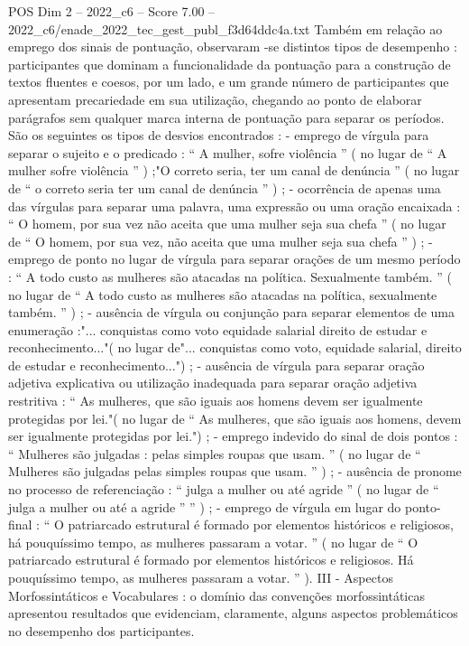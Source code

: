 \begin{textsample}{POS Dim 2 – 2022\_c6 – Score 7.00 – 2022\_c6/enade\_2022\_tec\_gest\_publ\_f3d64ddc4a.txt}
Também em relação ao emprego dos sinais de pontuação, observaram -se distintos tipos de desempenho : participantes que dominam a funcionalidade da pontuação para a construção de textos fluentes e coesos, por um lado, e um grande número de participantes que apresentam precariedade em sua utilização, chegando ao ponto de elaborar parágrafos sem qualquer marca interna de pontuação para separar os períodos.
São os seguintes os tipos de desvios encontrados : - emprego de vírgula para separar o sujeito e o predicado : “ A mulher, sofre violência ” ( no lugar de “ A mulher sofre violência ” ) ;"O correto seria, ter um canal de denúncia ” ( no lugar de “ o correto seria ter um canal de denúncia ” ) ; - ocorrência de apenas uma das vírgulas para separar uma palavra, uma expressão ou uma oração encaixada : “ O homem, por sua vez não aceita que uma mulher seja sua chefa ” ( no lugar de “ O homem, por sua vez, não aceita que uma mulher seja sua chefa ” ) ; - emprego de ponto no lugar de vírgula para separar orações de um mesmo período : “ A todo custo as mulheres são atacadas na política.
Sexualmente também. ” ( no lugar de “ A todo custo as mulheres são atacadas na política, sexualmente também. ” ) ; - ausência de vírgula ou conjunção para separar elementos de uma enumeração :"... conquistas como voto equidade salarial direito de estudar e reconhecimento..."( no lugar de"... conquistas como voto, equidade salarial, direito de estudar e reconhecimento...") ; - ausência de vírgula para separar oração adjetiva explicativa ou utilização inadequada para separar oração adjetiva restritiva : “ As mulheres, que são iguais aos homens devem ser igualmente protegidas por lei."( no lugar de “ As mulheres, que são iguais aos homens, devem ser igualmente protegidas por lei.") ; - emprego indevido do sinal de dois pontos : “ Mulheres são julgadas : pelas simples roupas que usam. ” ( no lugar de “ Mulheres são julgadas pelas simples roupas que usam. ” ) ; - ausência de pronome no processo de referenciação : “ julga a mulher ou até agride ” ( no lugar de “ julga a mulher ou até a agride ” ” ) ; - emprego de vírgula em lugar do ponto-final : “ O patriarcado estrutural é formado por elementos históricos e religiosos, há pouquíssimo tempo, as mulheres passaram a votar. ” ( no lugar de “ O patriarcado estrutural é formado por elementos históricos e religiosos.
Há pouquíssimo tempo, as mulheres passaram a votar. ” ).
III - Aspectos Morfossintáticos e Vocabulares : o domínio das convenções morfossintáticas apresentou resultados que evidenciam, claramente, alguns aspectos problemáticos no desempenho dos participantes.

\end{textsample}
